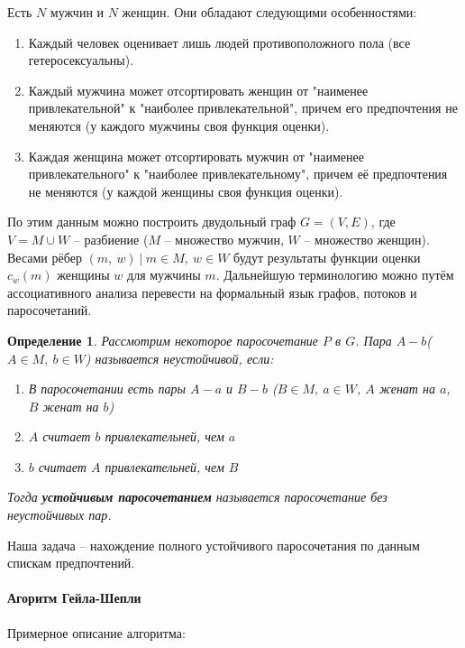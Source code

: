 \documentclass[a4paper,12pt]{article}
\newtheorem*{definition}{Определение}
\begin{document}
Есть $N$ мужчин и $N$ женщин. Они обладают следующими особенностями:
\begin{enumerate}
    \item Каждый человек оценивает лишь людей противоположного пола (все гетеросексуальны).
    \item Каждый мужчина может отсортировать женщин от "наименее привлекательной" к "наиболее привлекательной", причем его предпочтения не меняются (у каждого мужчины своя функция оценки).
    \item Каждая женщина может отсортировать мужчин от "наименее привлекательного" к "наиболее привлекательному", причем её предпочтения не меняются (у каждой женщины своя функция оценки).
\end{enumerate}
По этим данным можно построить двудольный граф $G = (V, E)$, где $V = M \cup W$ -- разбиение ($M$ -- множество мужчин, $W$ -- множество женщин). Весами рёбер $(m,\ w)\ |\ m \in M,\ w \in W$ будут результаты функции оценки $c_w(m)$ женщины $w$ для мужчины $m$. Дальнейшую терминологию можно путём ассоциативного анализа перевести на формальный язык графов, потоков и паросочетаний.
\begin{definition}
    Рассмотрим некоторое паросочетание $P$ в $G$. Пара $A-b$($A \in M,\ b \in W$) называется неустойчивой, если:
    \begin{enumerate}
        \item В паросочетании есть пары $A-a$ и $B-b$ ($B \in M,\ a \in W$, $A$ женат на $a$, $B$ женат на $b$)
        \item $A$ считает $b$ привлекательней, чем $a$
        \item $b$ считает $A$ привлекательней, чем $B$
    \end{enumerate}
    Тогда \textbf{устойчивым паросочетанием} называется паросочетание без неустойчивых пар.
\end{definition}

Наша задача -- нахождение полного устойчивого паросочетания по данным спискам предпочтений.

\paragraph{Агоритм Гейла-Шепли}

Примерное описание алгоритма:
\end{document}
